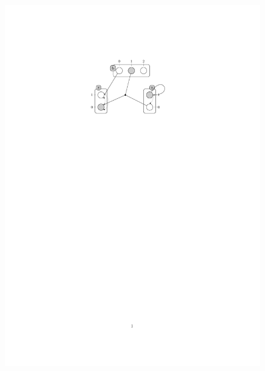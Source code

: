 \begin{figure}[htb!]
\begin{minipage}[t]{0.4\linewidth}
\includegraphics[width =1\linewidth]{images/PH-but.pdf}
\end{minipage}
\end{figure}


